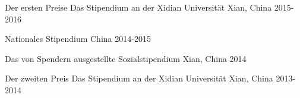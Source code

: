 



\begin{cvhonors}

  \cvhonor
    {Der ersten Preise} %
    {Das Stipendium  an der Xidian Universität} %
    {Xian, China } %
    {2015-2016} %

  \cvhonor
    {Nationales Stipendium} %
    {} %
    {China } %
    {2014-2015} %

  \cvhonor
    {} %
    {Das von Spendern ausgestellte Sozialstipendium} %
   {Xian, China } %
    {2014} %

  \cvhonor
    {Der zweiten Preis} %
    {Das Stipendium  an der Xidian Universität} %
    {Xian, China } %
    {2013-2014} %
    
\end{cvhonors}




